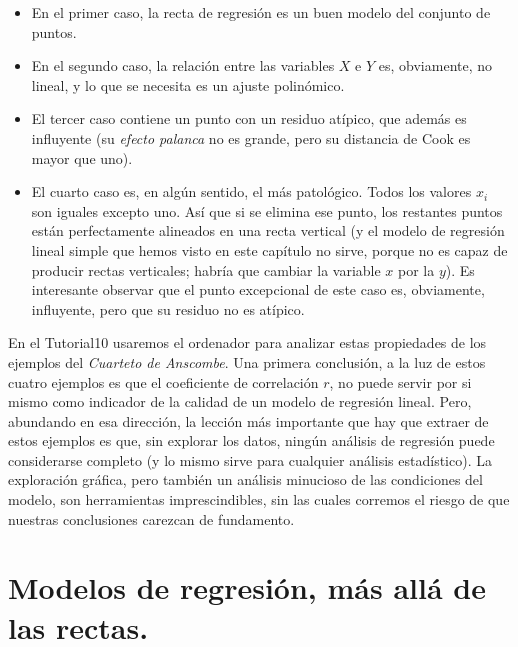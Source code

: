 \begin{itemize}
  \item En el primer caso, la recta de regresión es un  buen modelo del conjunto de puntos.
  \item En el segundo caso, la relación entre las variables $X$ e $Y$ es, obviamente, no lineal, y lo que se necesita es un ajuste polinómico.
  \item El tercer caso contiene un punto con un residuo atípico, que además es influyente (su {\em efecto palanca} no es grande, pero su distancia de Cook es mayor que uno).
  \item El cuarto caso es, en algún sentido, el más patológico. Todos los valores $x_i$ son iguales excepto uno. Así que si se elimina ese punto, los restantes puntos están perfectamente alineados en una recta vertical (y el modelo de regresión lineal simple que hemos visto en este capítulo no sirve, porque no es capaz de producir rectas verticales; habría que cambiar la variable $x$ por la $y$). Es interesante observar que el punto excepcional de este caso es, obviamente, influyente, pero que su residuo no es atípico.
\end{itemize}

En el Tutorial10 usaremos el ordenador para analizar estas propiedades de los ejemplos del {\em Cuarteto de Anscombe}. Una primera conclusión, a la luz de estos cuatro ejemplos es que el coeficiente de correlación $r$, no puede servir por si mismo como indicador de la calidad de un modelo de regresión lineal. Pero, abundando en esa dirección, la lección más importante que hay que extraer de estos ejemplos es que, sin explorar los datos, ningún análisis de regresión puede considerarse completo (y lo mismo sirve para cualquier análisis estadístico). La exploración gráfica, pero también un análisis minucioso de las condiciones del modelo, son herramientas imprescindibles, sin las cuales corremos el riesgo de que nuestras conclusiones carezcan de fundamento.




\section{Modelos de regresión, más allá de las rectas.}
\label{cap10:sec:ModelosDeRegresion}
\\



